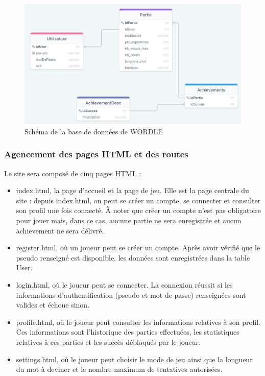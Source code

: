 \begin{figure}[h!]
\centering
\includegraphics[width=12cm]{figures/bddfinale.PNG}
\caption{Schéma de la base de données de WORDLE}
\end{figure}

\break

\subsubsection{Agencement des pages HTML et des routes}
Le site sera composé de cinq pages HTML :
\begin{itemize}
    \item index.html, la page d’accueil et la page de jeu. Elle est la page centrale du site : depuis index.html, on peut se créer un compte, se connecter et consulter son profil une fois connecté. À noter que créer un compte n’est pas obligatoire pour jouer mais, dans ce cas, aucune partie ne sera enregistrée et aucun achievement ne sera délivré.
    \item register.html, où un joueur peut se créer un compte. Après avoir vérifié que le pseudo renseigné est disponible, les données sont enregistrées dans la table User.
    \item login.html, où le joueur peut se connecter. La connexion réussit si les informations d’authentification (pseudo et mot de passe) renseignées sont valides et échoue sinon.
    \item profile.html, où le joueur peut consulter les informations relatives à son profil. Ces informations sont l’historique des parties effectuées, les statistiques relatives à ces parties et les succès débloqués par le joueur.
    \item settings.html, où le joueur peut choisir le mode de jeu ainsi que la longueur du mot à deviner et le nombre maximum de tentatives autorisées.
\end{itemize}

